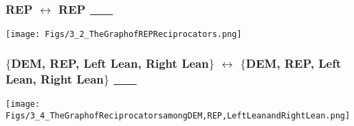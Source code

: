\documentclass{beamer}
\begin{document}
\begin{frame}
\frametitle{REP $\leftrightarrow$ REP \phantom{This text will be invisible be invisible} \href{http://politicalnets.com/view/gcc_rrr}{\texttt{\textcolor{white}{Link}}}}

\begin{center}
\texttt{[image: Figs/3\_2\_TheGraphofREPReciprocators.png]} \hspace*{4cm}
\end{center}

\end{frame}



\begin{frame}
\frametitle{\scriptsize $\{$DEM, REP, Left Lean, Right Lean$\}$ $\leftrightarrow$ $\{$DEM, REP, Left Lean, Right Lean$\}$  \phantom{This text} \href{http://politicalnets.com/view/otherr}{\texttt{\textcolor{white}{Link}}}}

\begin{center}
\texttt{[image: Figs/3\_4\_TheGraphofReciprocatorsamongDEM,REP,LeftLeanandRightLean.png]} \hspace*{4cm}
\end{center}

\end{frame}
\end{document}
